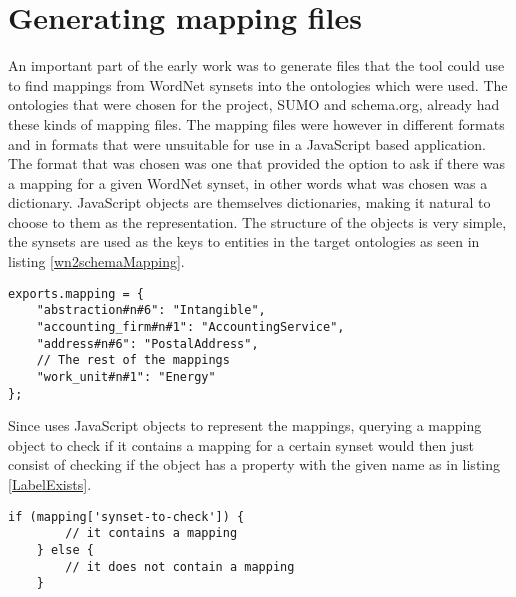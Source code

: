 \section{Generating mapping files}
An important part of the early work was to generate files that the tool could use to find mappings from WordNet synsets
into the ontologies which were used.
The ontologies that were chosen for the project, SUMO  and schema.org, already had these kinds of mapping files.
The mapping files were however in different formats and in formats that were unsuitable for use in a JavaScript based application.
The format that was chosen was one that provided the option to ask if there was a mapping for a given WordNet synset,
in other words what was chosen was a dictionary.
JavaScript objects are themselves dictionaries, making it natural to choose to them as the representation.
The structure of the objects is very simple,
the synsets are used as the keys to entities in the target ontologies as seen in listing \ref{wn2schemaMapping}.

\begin{lstlisting}[label=wn2schemaMapping, caption={Excerpt from the \href{https://github.com/EivindEE/Madame/blob/master/mappings/wn2schema.js}{wn2schema.js} mapping file}]
exports.mapping = {
	"abstraction#n#6": "Intangible",
	"accounting_firm#n#1": "AccountingService",
	"address#n#6": "PostalAddress",
	// The rest of the mappings
	"work_unit#n#1": "Energy"
};
\end{lstlisting}

Since \theartefact uses JavaScript objects to represent the mappings,
querying a mapping object to check if it contains a mapping for a certain synset would then just consist of checking if
the object has a property with the given name as in listing \ref{LabelExists}.
\begin{lstlisting}[label=LabelExists,caption=Testing if a mapping exists]
	if (mapping['synset-to-check']) {
		// it contains a mapping
	} else {
		// it does not contain a mapping
	}
\end{lstlisting}

